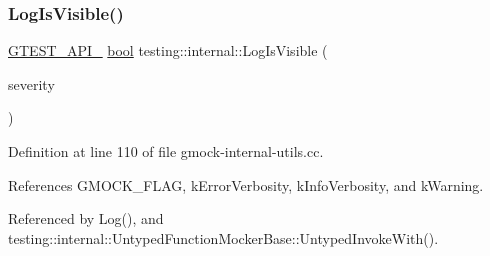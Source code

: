 \subsubsection{\texorpdfstring{Log\+Is\+Visible()}{LogIsVisible()}}
{\footnotesize\ttfamily \hyperlink{gtest-port_8h_aa73be6f0ba4a7456180a94904ce17790}{G\+T\+E\+S\+T\+\_\+\+A\+P\+I\+\_\+} \hyperlink{classbool}{bool} testing\+::internal\+::\+Log\+Is\+Visible (\begin{DoxyParamCaption}\item[{\hyperlink{namespacetesting_1_1internal_a203d1a8a2147a53d12bbdae40d443914}{Log\+Severity}}]{severity }\end{DoxyParamCaption})}



Definition at line 110 of file gmock-\/internal-\/utils.\+cc.



References G\+M\+O\+C\+K\+\_\+\+F\+L\+AG, k\+Error\+Verbosity, k\+Info\+Verbosity, and k\+Warning.



Referenced by Log(), and testing\+::internal\+::\+Untyped\+Function\+Mocker\+Base\+::\+Untyped\+Invoke\+With().


